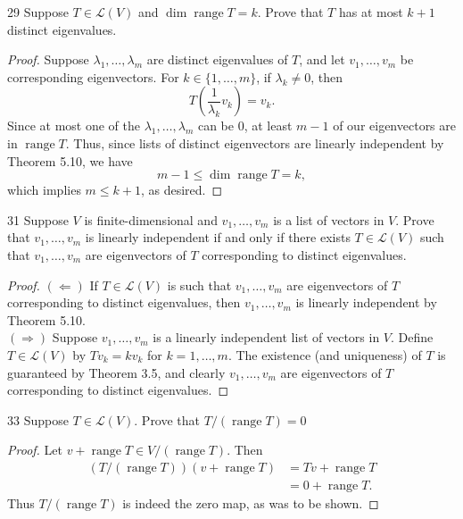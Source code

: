 \documentclass{extarticle}
\newenvironment{problem}[1]{\begin{prob*}{#1}{}}{\end{prob*}}
\newcommand{\Hom}{\mathcal{L}}
\DeclareMathOperator{\Range}{range}
\begin{document}
\begin{problem}{29}
Suppose $T\in\Hom(V)$ and $\dim\Range T = k$.  Prove that $T$ has at most $k + 1$ distinct eigenvalues.
\end{problem}
\begin{proof}
Suppose $\lambda_1,\dots, \lambda_m$ are distinct eigenvalues of $T$, and let $v_1,\dots, v_m$ be corresponding eigenvectors.  For $k\in\{1,\dots,m\}$, if $\lambda_k\neq 0$, then 
\begin{equation*}
T\left(\frac{1}{\lambda_k} v_k\right) = v_k.
\end{equation*}
Since at most one of the $\lambda_1,\dots, \lambda_m$ can be $0$, at least $m-1$ of our eigenvectors are in $\Range T$.  Thus, since lists of distinct eigenvectors are linearly independent by Theorem 5.10, we have
\begin{equation*}
m-1\leq \dim\Range T = k,
\end{equation*}
which implies $m\leq k+1$, as desired.
\end{proof}

\begin{problem}{31}
Suppose $V$ is finite-dimensional and $v_1,\dots,v_m$ is a list of vectors in $V$.  Prove that $v_1,\dots,v_m$ is linearly independent if and only if there exists $T\in\Hom(V)$ such that $v_1,\dots,v_m$ are eigenvectors of $T$ corresponding to distinct eigenvalues.
\end{problem}
\begin{proof}
$(\Leftarrow)$ If $T\in \Hom(V)$ is such that $v_1,\dots,v_m$ are eigenvectors of $T$ corresponding to distinct eigenvalues, then $v_1,\dots,v_m$ is linearly independent by Theorem 5.10.\\
\indent $(\Rightarrow)$ Suppose $v_1,\dots,v_m$ is a linearly independent list of vectors in $V$.  Define $T\in\Hom(V)$ by $Tv_k = kv_k$ for $k = 1,\dots, m$.  The existence (and uniqueness) of $T$ is guaranteed by Theorem 3.5, and clearly $v_1,\dots, v_m$ are eigenvectors of $T$ corresponding to distinct eigenvalues.  
\end{proof}

\begin{problem}{33}
Suppose $T\in\Hom(V)$.  Prove that $T/(\Range T) = 0$ 
\end{problem}
\begin{proof}
Let $v + \Range T\in V/(\Range T)$.  Then
\begin{align*}
(T/(\Range T))(v + \Range T) &= Tv + \Range T\\
&= 0 + \Range T.
\end{align*}
Thus $T/(\Range T)$ is indeed the zero map, as was to be shown.
\end{proof}
\end{document}
